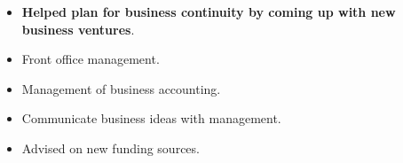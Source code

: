 \documentclass[theme]{cv_einstein}
\begin{document}
\begin{paracol}{2}
\begin{rightcolumn}
            {
                \begin{itemize}
                    \item \textbf{Helped plan for business continuity by coming up with new business ventures}.
                    \item Front office management.
                    \item Management of business accounting.
                    \item Communicate business ideas with management.
                    \item Advised on new funding sources.
                \end{itemize}
            }
            \vspace{\itemspace}\\
            

\end{rightcolumn}
\end{paracol}
\end{document}
